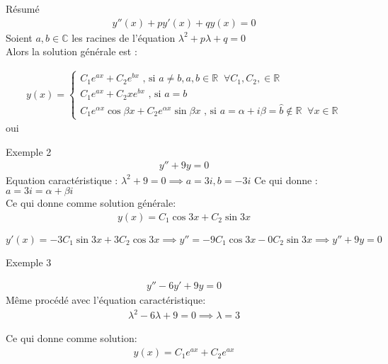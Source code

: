     \begin{parag}{Résumé}
        \begin{align*}
            y''(x) + py'(x) + q y(x) = 0
        \end{align*}
        Soient $a, b \in \mathbb{C}$ les racines de l'équation $ \lambda^2 + p \lambda + q = 0$
    \\
    Alors la solution générale est : 

    \begin{align*}
       y(x) = \begin{cases}
              C_1 e^{ax} + C_2 e^{bx} \text{ , si } a \neq b, a, b \in \mathbb{R} \; \; \forall C_1, C_2, \in \mathbb{R} \\
             C_1e^{ax} + C_2xe^{bx} \text{ , si } a = b \\
                C_1e^{\alpha x} \cos \beta x + C_2 e^{ \alpha x} \sin \beta x \text{ , si } a = \alpha + i \beta = \hat{b} \notin \mathbb{R} \; \; \forall x \in \mathbb{R}
        \end{cases}
    \end{align*}
   oui 
    \begin{subparag}{Exemple 2}
       \begin{align*}
           y'' + 9y = 0
       \end{align*}
       Equation caractéristique : $ \lambda^2 + 9 = 0 \implies a = 3i, b = -3i$ Ce qui donne : $a = 3i = \alpha + \beta i$
       \\
       Ce qui donne comme solution générale:
       \begin{align*}
           y(x) = C_1 \cos 3x + C_2 \sin 3x
       \end{align*}
       
     $y'(x) = -3C_1\sin 3x + 3C_2\cos 3x \implies y'' = -9C_1 \cos 3x - 0 C_2 \sin 3x \implies y'' + 9y = 0$
    \end{subparag}
    \begin{subparag}{Exemple 3}
        
        \begin{align*}
            y'' -6y' + 9y = 0
        \end{align*}
        Même procédé avec l'équation caractéristique:
        \begin{align*}
            \lambda^2 - 6 \lambda + 9 = 0 \implies \lambda = 3
        \end{align*}
        
        Ce qui donne comme solution:
        \begin{align*}
            y(x) = C_1 e^{ ax} + C_2 e^{ax}
        \end{align*}
    \end{subparag}
    \end{parag}
    

